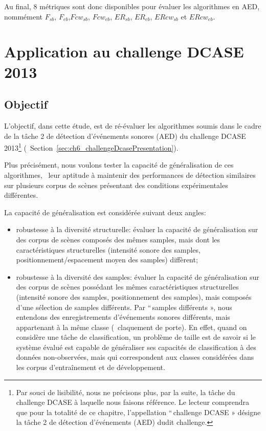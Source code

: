 Au final, 8 métriques sont donc disponibles pour évaluer les algorithmes en AED, nommément $F_{sb}$, $F_{eb}$,$Fcw_{sb}$, $Fcw_{eb}$, $ER_{sb}$, $ER_{eb}$, $ERcw_{sb}$ et $ERcw_{eb}$.


\section{Application au challenge DCASE  2013}
\label{sec:ch5_appDcase2013}

\subsection{Objectif}

L'objectif, dans cette étude, est de ré-évaluer les algorithmes soumis dans le cadre de la tâche 2 de détection d'événements sonores (AED) du challenge DCASE 2013\footnote{Par souci de lisibilité, nous ne précisons plus, par la suite, la tâche du challenge DCASE à laquelle nous faisons référence. Le lecteur comprendra que pour la totalité de ce chapitre, l'appellation ``\,challenge DCASE » désigne la tâche 2 de détection d'événements (AED) dudit challenge.} (\cf~Section~\ref{sec:ch6_challengeDcasePresentation}).

Plus précisément, nous voulons tester la capacité de généralisation de ces algorithmes, \ie~leur aptitude à maintenir des performances de détection similaires sur plusieurs corpus de scènes présentant des conditions expérimentales différentes.

La capacité de généralisation est considérée suivant deux angles:

\begin{itemize}
\item robustesse à la diversité structurelle: évaluer la capacité de généralisation sur des corpus de scènes composés des mêmes samples, mais dont les caractéristiques structurelles (intensité sonore des samples, positionnement/espacement moyen des samples) diffèrent;
\item robustesse à la diversité des samples: évaluer la capacité de généralisation sur des corpus de scènes possédant les mêmes caractéristiques structurelles (intensité sonore des samples, positionnement des samples), mais composés d'une sélection de samples différents. Par ``\,samples différents », nous entendons des enregistrements d'événements sonores différents, mais appartenant à la même classe (\eg~claquement de porte). En effet, quand on considère une tâche de classification, un problème de taille est de savoir si le système évalué est capable de généraliser ses capacités de classification à des données non-observées, mais qui correspondent aux classes considérées dans les corpus d’entraînement et de développement.
\end{itemize}

